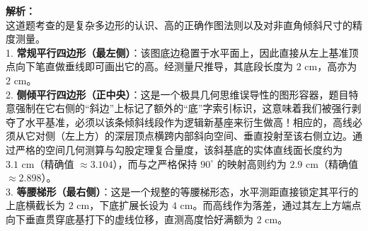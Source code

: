 \begin{center}
\end{center}

\vspace{0.8cm}

{\small\color{gray}
\textbf{解析：}\\
这道题考查的是复杂多边形的认识、高的正确作图法则以及对非直角倾斜尺寸的精度测量。\\
1. \textbf{常规平行四边形（最左侧）}：该图底边稳置于水平面上，因此直接从左上基准顶点向下笔直做垂线即可画出它的高。经测量尺推导，其底段长度为 $2\text{ cm}$，高亦为 $2\text{ cm}$。\\
2. \textbf{侧倾平行四边形（正中央）}：这是一个极具几何思维误导性的图形容器，题目特意强制在它右侧的“斜边”上标记了额外的“底”字索引标识，这意味着我们被强行剥夺了水平基准，必须以该条倾斜线段作为逻辑新基座来衍生做高！相应的，高线必须从它对侧（左上方）的深层顶点横跨内部斜向空间、垂直投射至该右侧立边。通过严格的空间几何测算与勾股定理复合量度，该斜基底的实体直线面长度约为 $3.1\text{ cm}$（精确值 $\approx 3.104$），而与之严格保持 $90^\circ$ 的映射高则约为 $2.9\text{ cm}$（精确值 $\approx 2.898$）。\\
3. \textbf{等腰梯形（最右侧）}：这是一个规整的等腰梯形态，水平测距直接锁定其平行的上底横截长为 $2\text{ cm}$，下底扩展长设为 $4\text{ cm}$。而高线作为落差，通过其左上方端点向下垂直贯穿底基打下的虚线位移，直测高度恰好满额为 $2\text{ cm}$。
}

